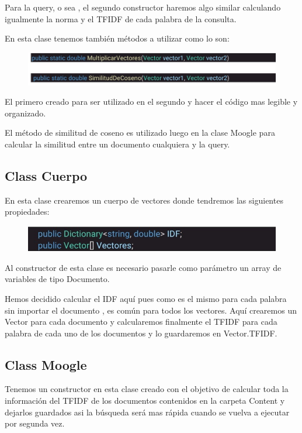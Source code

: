 \documentclass[a4paper,12pt]{article}
\begin{document}
Para la query, o sea , el segundo constructor haremos algo similar calculando igualmente la norma y el TFIDF de cada palabra 
de la consulta.

En esta clase tenemos también métodos a utilizar como lo son:

\begin{figure}[H]
    \centering
    \includegraphics[width=\textwidth]{imagenes/4.jpg}
\end{figure}

El primero creado para ser utilizado en el segundo y hacer el código mas legible y organizado.

El método de similitud de coseno es utilizado luego en la clase Moogle para calcular la similitud entre un documento cualquiera y la query.

\subsection{Class Cuerpo}\label{sub:Cuerpo}

En esta clase crearemos un cuerpo de vectores donde tendremos las siguientes propiedades:

\begin{figure}[H]
    \centering
    \includegraphics[width=\textwidth]{imagenes/5.jpg}
\end{figure}

Al constructor de esta clase es necesario pasarle como parámetro un array de variables de tipo Documento. 

Hemos decidido calcular el IDF aquí pues como es el mismo para cada palabra sin importar el documento , es común para todos los vectores.
Aquí crearemos un Vector para cada documento y calcularemos finalmente el TFIDF para cada palabra de cada uno de los documentos y lo guardaremos en Vector.TFIDF.

\subsection{Class Moogle}\label{sub:Moogle}

Tenemos un constructor en esta clase creado con el objetivo de calcular toda la información del TFIDF de los documentos contenidos en la carpeta Content y dejarlos 
guardados asi la búsqueda será mas rápida cuando se vuelva a ejecutar por segunda vez.
\end{document}
